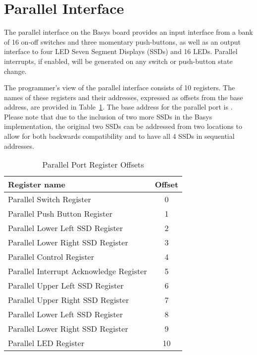 \section{Parallel Interface}

The parallel interface on the Basys board provides an input interface
from a bank of 16 on-off switches and three momentary push-buttons, as
well as an output interface to four LED Seven Segment Displays (SSDs)
and 16 LEDs.
Parallel interrupts, if enabled, will be generated on any switch or
push-button state change.

The programmer's view of the parallel interface consists of 10
registers. The names of these registers and their addresses,
expressed as offsets from the base address, are provided in
Table~\ref{table:parallel_offsets}. The base address for the parallel
port is \src{\LOCPARABASE}. Please note that due to the inclusion of
two more SSDs in the Basys implementation, the original two SSDs can
be addressed from two locations to allow for both backwards compatibility
and to have all 4 SSDs in sequential addresses.

\begin{table}[h]
\begin{center}
\begin{tabular}{|l|c|}
\hline
\textbf{Register name} & \textbf{Offset} \\
\hline
Parallel Switch Register & 0 \\
\hline
Parallel Push Button Register & 1 \\
\hline
Parallel Lower Left SSD Register & 2 \\
\hline
Parallel Lower Right SSD Register & 3 \\
\hline
Parallel Control Register & 4 \\
\hline
Parallel Interrupt Acknowledge Register & 5 \\
\hline
Parallel Upper Left SSD Register & 6 \\
\hline
Parallel Upper Right SSD Register & 7 \\
\hline
Parallel Lower Left SSD Register & 8 \\
\hline
Parallel Lower Right SSD Register & 9 \\
\hline
Parallel LED Register & 10 \\
\hline
\end{tabular}
\caption{Parallel Port Register Offsets}
\label{table:parallel_offsets}
\end{center}
\end{table}

